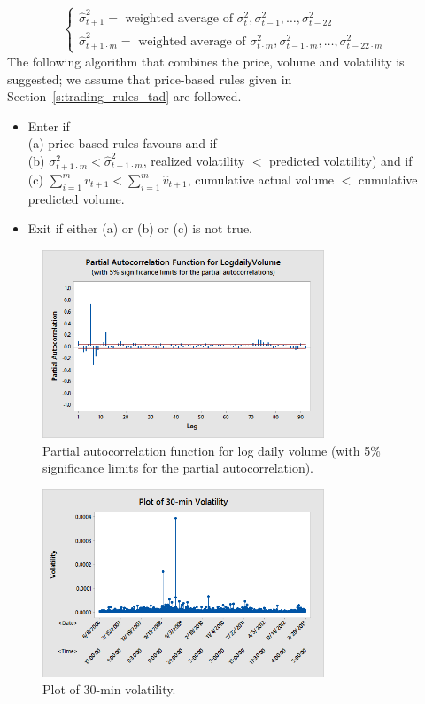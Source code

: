 	\[
	\begin{cases}
	\hat{\sigma}_{t+1}^2 = \text{ weighted average of } \sigma_t^2, \sigma_{t-1}^2, \ldots, \sigma_{t-22}^2 & \\
	\hat{\sigma}^2_{t+1 \cdot m}= \text{ weighted average of } \sigma_{t\cdot m}^2, \sigma_{t-1 \cdot m}^2, \ldots, \sigma_{t-22\cdot m}^2 & 
	\end{cases}
	\]
The following algorithm that combines the price, volume and volatility is suggested; we assume that price-based rules given in Section~\ref{s:trading_rules_tad} are followed.
	\begin{itemize}
	\item Enter if \\
	(a) price-based rules favours and if \\
	(b) $\sigma_{t+1\cdot m}^2< \hat{\sigma}_{t+1\cdot m}^2$, realized volatility $<$ predicted volatility) and if \\
	(c) $\sum_{i=1}^m v_{t+1} < \sum_{i=1}^m \hat{v}_{t+1}$, cumulative actual volume $<$ cumulative predicted volume. 
	\item Exit if either (a) or (b) or (c) is not true. 
	\end{itemize}
	
        \begin{figure}[H]
        \centering
        \includegraphics[width=0.75\textwidth]{chapters/chapter_stat_ts/figures/logdaily.png}
        \caption{Partial autocorrelation function for log daily volume (with 5\% significance limits for the partial autocorrelation). \label{fig:logdailyvolume}}
        \end{figure}
        
        \begin{figure}[H]
        \centering
        \includegraphics[width=0.75\textwidth]{chapters/chapter_stat_ts/figures/30min.png}
        \caption{Plot of 30-min volatility. \label{fig:30min}}
        \end{figure}
        
